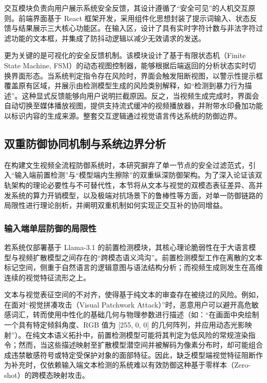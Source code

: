交互模块负责向用户展示系统安全反馈，其设计遵循了“安全可见”的人机交互原则。前端界面基于 React 框架开发，采用组件化思想封装了提示词输入、状态反馈与结果展示三大核心功能区。在输入区，设计了具有实时字符计数与非法字符过滤功能的文本框，并集成了防抖动逻辑以减少无效请求的发送。

更为关键的是可视化的安全反馈机制。该模块设计了基于有限状态机（Finite State Machine, FSM）的动态视图控制器，能够根据后端返回的分析状态实时切换界面形态。当系统判定指令存在风险时，界面会触发阻断视图，以警示性提示框覆盖原有区域，并展示由检测模型生成的风险类别解释，如“检测到暴力行为描述”。这种显式反馈能够向用户说明拦截原因。反之，当视频生成完成时，界面会自动切换至媒体播放视图，提供支持流式缓冲的视频播放器，并附带水印叠加功能以标识内容的生成来源。整套交互逻辑通过视觉语言传达系统的防御边界。

\subsection{双重防御协同机制与系统边界分析}

在构建文生视频全流程防御系统时，本研究摒弃了单一节点的安全过滤范式，引入“输入端前置检测”与“模型端内生擦除”的双重纵深防御架构。为了深入论证该双轨架构的理论必要性与不可替代性，本节将从文本与视觉的双模态表征差异、高并发系统的算力开销模型，以及极端对抗场景下的鲁棒性等方面，对单一防御链路的局限性进行理论剖析，并阐明双重机制如何实现正交互补的协同增益。

\subsubsection{输入端单层防御的局限性}
若系统仅部署基于 Llama-3.1 的前置检测模块，其核心理论脆弱性在于大语言模型与视频扩散模型之间存在的“跨模态语义鸿沟”。前置检测模型工作在离散的文本标记空间，侧重于自然语言的逻辑意图与语法结构分析；而视频生成则发生在高维连续的视觉特征流形之上。

文本与视觉表征空间的不对齐，使得基于纯文本的审查存在被绕过的风险。例如，在面对“视觉拼凑攻击（Visual Patchwork Attack）”时，恶意用户可以避开高危敏感词汇，转而使用中性化的基础几何与物理参数进行描述（如：“在画面中央绘制一个具有特定倾斜角度、RGB 值为 [255, 0, 0] 的几何阵列，并应用动态光影映射”）。在纯文本语义拓扑中，前置检测模型可能将其判定为低风险的常规渲染指令；然而，当这些描述映射至扩散模型潜空间并被解码为像素分布时，却可能组合成违禁敏感符号或特定受保护对象的面部特征。因此，缺乏模型端视觉特征阻断作为补充时，仅依赖输入端文本检测的系统难以有效防御这种基于零样本（Zero-shot）的跨模态映射攻击。



